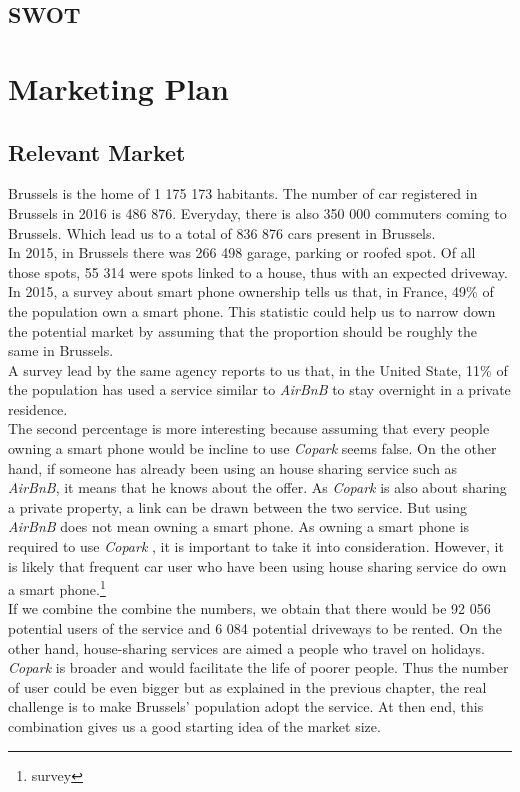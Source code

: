 \documentclass[12pt,a4paper,oneside]{book}
\newcommand{\bp}{\textit{Copark }}
\begin{document}
\section{SWOT}

\chapter{Marketing Plan}

\section{Relevant Market}
Brussels is the home of 1 175 173\cite{ciafb} habitants. The number of car registered in Brussels in 2016 is 486 876.\cite{mtvr} Everyday, there is also 350 000 commuters coming to Brussels.\cite{bxcommu} Which lead us to a total of 836 876 cars present in Brussels.\\
In 2015, in Brussels there was 266 498 garage, parking or roofed spot. Of all those spots, 55 314 were spots linked to a house, thus with an expected driveway.\cite{atpb}\\

In 2015, a survey about smart phone ownership tells us that, in France, 49\% of the population own a smart phone.\cite{spown} This statistic could help us to narrow down the potential market by assuming that the proportion should be roughly the same in Brussels.\\
A survey lead by the same agency reports to us that, in the United State, 11\% of the population has used a service similar to \textit{AirBnB} to stay overnight in a private residence.\cite{airbnbuse}\\
The second percentage is more interesting because assuming that every people owning a smart phone would be incline to use \bp seems false. On the other hand, if someone has already been using an house sharing service such as \textit{AirBnB}, it means that he knows about the offer. As \bp is also about sharing a private property, a link can be drawn between the two service. But using \textit{AirBnB} does not mean owning a smart phone. As owning a smart phone is required to use \bp, it is important to take it into consideration. However, it is likely that frequent car user who have been using house sharing service do own a smart phone.\footnote{survey}\\

If we combine the combine the numbers, we obtain that there would be 92 056 potential users of the service and 6 084 potential driveways to be rented. On the other hand, house-sharing services are aimed a people who travel on holidays. \bp is broader and would facilitate the life of poorer people. Thus the number of user could be even bigger but as explained in the previous chapter, the real challenge is to make Brussels' population adopt the service. At then end, this combination gives us a good starting idea of the market size.\\
\end{document}

